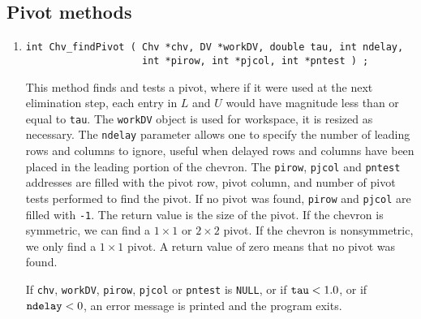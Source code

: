 \subsection{Pivot methods}
\label{subsection:Chv:proto:pivot}
\par
\begin{enumerate}
\item
\begin{verbatim}
int Chv_findPivot ( Chv *chv, DV *workDV, double tau, int ndelay,
                    int *pirow, int *pjcol, int *pntest ) ;
\end{verbatim}
This method finds and tests a pivot, where if it were used at the
next elimination step, each entry in $L$ and $U$ would have
magnitude less than or equal to {\tt tau}.
The {\tt workDV} object is used for workspace,
it is resized as necessary.
The {\tt ndelay} parameter allows one to specify the number of leading
rows and columns to ignore, useful when delayed rows and columns
have been placed in the leading portion of the chevron.
The {\tt pirow}, {\tt pjcol} and {\tt pntest} addresses are filled
with the pivot row, pivot column, and number of pivot tests
performed to find the pivot.
If no pivot was found, {\tt pirow} and {\tt pjcol} are filled with
{\tt -1}.
The return value is the size of the pivot.
If the chevron is symmetric, we can find a 
$1 \times 1$ or $2 \times 2$ pivot.
If the chevron is nonsymmetric, we only find a $1 \times 1$ pivot.
A return value of zero means that no pivot was found.
\par {}
If {\tt chv}, {\tt workDV}, {\tt pirow}, {\tt pjcol} or {\tt pntest}
is {\tt NULL},
or if ${\tt tau} < 1.0$, or if ${\tt ndelay} < 0$,
an error message is printed and the program exits.
\end{enumerate}
\par
